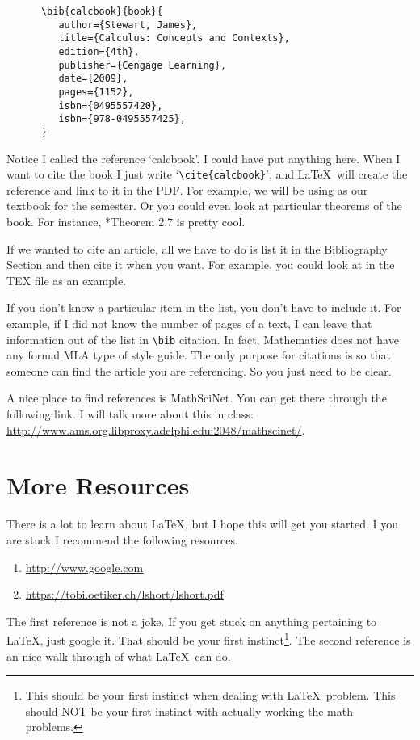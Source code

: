 \documentclass{amsart}
\begin{document}
   \begin{verbatim}  
      \bib{calcbook}{book}{
         author={Stewart, James},
         title={Calculus: Concepts and Contexts},
         edition={4th},
         publisher={Cengage Learning},
         date={2009},
         pages={1152},
         isbn={0495557420},
         isbn={978-0495557425},
      }
   \end{verbatim}

   Notice I called the reference `calcbook'. I could have put anything here. When I want to cite the book I just write `\verb|\cite{calcbook}|', and \LaTeX\ will create the reference and link to it in the PDF. For example, we will be using \cite{calcbook} as our textbook for the semester.  Or you could even look at particular theorems of the book. For instance, \cite{calcbook}*{Theorem 2.7} is pretty cool.

   If we wanted to cite an article, all we have to do is list it in the Bibliography Section and then cite it when you want. For example, you could look at \cite{supercoolarticle} in the TEX file as an example. 

   If you don't know a particular item in the list, you don't have to include it. For example, if I did not know the number of pages of a text, I can leave that information out of the list in \verb|\bib| citation. In fact, Mathematics does not have any formal MLA type of style guide. The only purpose for citations is so that someone can find the article you are referencing. So you just need to be clear. 

   A nice place to find references is MathSciNet. You can get there through the following link. I will talk more about this in class: \url{http://www.ams.org.libproxy.adelphi.edu:2048/mathscinet/}.



\section{More Resources} \label{more}


   There is a lot to learn about \LaTeX, but I hope this will get you started. I you are stuck I recommend the following resources.
   \begin{enumerate}
      \item \url{http://www.google.com}
      \item \url{https://tobi.oetiker.ch/lshort/lshort.pdf}
   \end{enumerate}
   The first reference is not a joke. If you get stuck on anything pertaining to \LaTeX, just google it. That should be your first instinct\footnote{This should be your first instinct when dealing with \LaTeX\ problem. This should NOT be your first instinct with actually working the math problems.}. The second reference is an nice walk through of what \LaTeX\ can do. 
\end{document}
